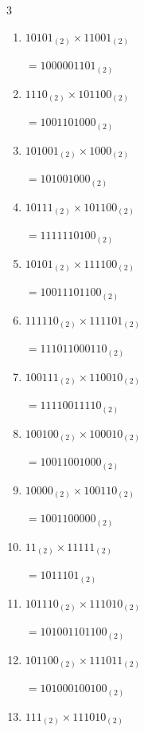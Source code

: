 \begin{multicols}{3}
\begin{enumerate}
        $=1101001110_{(2)}$

  \item $10101_{(2)} \times 11001_{(2)}$

        $=1000001101_{(2)}$

  \item $1110_{(2)} \times 101100_{(2)}$

        $=1001101000_{(2)}$

  \item $101001_{(2)} \times 1000_{(2)}$

        $=101001000_{(2)}$

  \item $10111_{(2)} \times 101100_{(2)}$

        $=1111110100_{(2)}$

\columnbreak %

\resetques

  \item $10101_{(2)} \times 111100_{(2)}$

        $=10011101100_{(2)}$

  \item $111110_{(2)} \times 111101_{(2)}$

        $=111011000110_{(2)}$

  \item $100111_{(2)} \times 110010_{(2)}$

        $=11110011110_{(2)}$

  \item $100100_{(2)} \times 100010_{(2)}$

        $=10011001000_{(2)}$

  \item $10000_{(2)} \times 100110_{(2)}$

        $=1001100000_{(2)}$

\columnbreak %

  \item $11_{(2)} \times 11111_{(2)}$

        $=1011101_{(2)}$

  \item $101110_{(2)} \times 111010_{(2)}$

        $=101001101100_{(2)}$

  \item $101100_{(2)} \times 111011_{(2)}$

        $=101000100100_{(2)}$

  \item $111_{(2)} \times 111010_{(2)}$


\end{enumerate}
\end{multicols}
